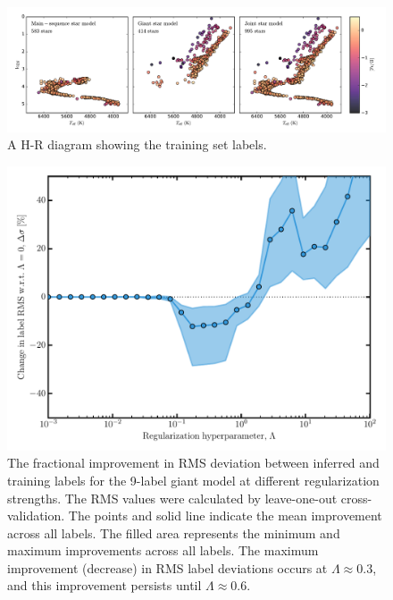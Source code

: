 \documentclass[preprint,trackchanges]{aastex}
\begin{document}
\clearpage

\begin{figure}[p]
\includegraphics[width=\textwidth]{figures/hrd-train-set.pdf}
\caption{A H-R diagram showing the training set labels.\label{fig:training-set-hrd}}
\end{figure}

\begin{figure}[p]
\includegraphics[width=\textwidth]{figures/set-giant-regularization.pdf}
\caption{The fractional improvement in RMS deviation between inferred and training labels for the 9-label giant model at different regularization strengths.  The RMS values were calculated by leave-one-out cross-validation.  The points and solid line indicate the mean improvement across all labels. The filled area represents the minimum and maximum improvements across all labels.  The maximum improvement (decrease) in RMS label deviations occurs at $\Lambda \approx 0.3$, and this improvement persists until $\Lambda \approx 0.6$.}
\end{figure}
\end{document}
